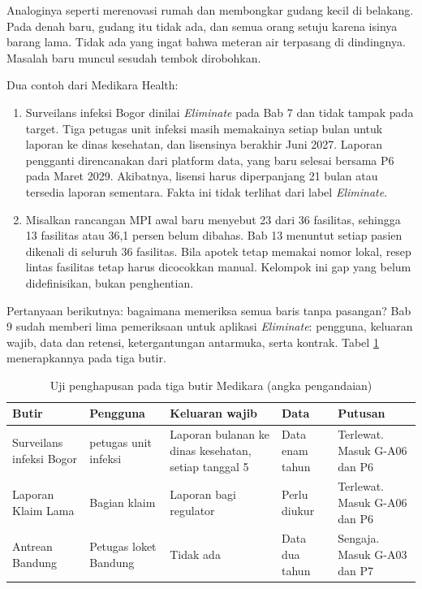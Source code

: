 Analoginya seperti merenovasi rumah dan membongkar gudang kecil di belakang. Pada
denah baru, gudang itu tidak ada, dan semua orang setuju karena isinya barang lama.
Tidak ada yang ingat bahwa meteran air terpasang di dindingnya. Masalah baru muncul
sesudah tembok dirobohkan.

Dua contoh dari Medikara Health:
\begin{enumerate}
  \item Surveilans infeksi Bogor dinilai \textit{Eliminate} pada Bab 7 dan tidak
        tampak pada target. Tiga petugas unit infeksi masih memakainya setiap bulan
        untuk laporan ke dinas kesehatan, dan lisensinya berakhir Juni 2027. Laporan
        pengganti direncanakan dari platform data, yang baru selesai bersama P6 pada
        Maret 2029. Akibatnya, lisensi harus diperpanjang 21 bulan atau tersedia
        laporan sementara. Fakta ini tidak terlihat dari label \textit{Eliminate}.
  \item Misalkan rancangan MPI awal baru menyebut 23 dari 36 fasilitas, sehingga 13
        fasilitas atau 36,1 persen belum dibahas. Bab 13 menuntut setiap pasien
        dikenali di seluruh 36 fasilitas. Bila apotek tetap memakai nomor lokal, resep
        lintas fasilitas tetap harus dicocokkan manual. Kelompok ini gap yang belum
        didefinisikan, bukan penghentian.
\end{enumerate}

Pertanyaan berikutnya: bagaimana memeriksa semua baris tanpa pasangan? Bab 9 sudah
memberi lima pemeriksaan untuk aplikasi \textit{Eliminate}: pengguna, keluaran wajib,
data dan retensi, ketergantungan antarmuka, serta kontrak. Tabel
\ref{tab:ch11-uji-penghapusan} menerapkannya pada tiga butir.

\begin{table}[!htb]
  \centering
  \caption{Uji penghapusan pada tiga butir Medikara (angka pengandaian)}
  \label{tab:ch11-uji-penghapusan}
  \footnotesize
  \begin{tabularx}{\textwidth}{>{\raggedright\arraybackslash}p{2.2cm}>{\raggedright\arraybackslash}p{2.3cm}>{\raggedright\arraybackslash}X>{\raggedright\arraybackslash}p{2.1cm}>{\raggedright\arraybackslash}X}
    \hline
    \textbf{Butir} & \textbf{Pengguna} & \textbf{Keluaran wajib} & \textbf{Data} & \textbf{Putusan} \\ \hline
    Surveilans infeksi Bogor & 3 petugas unit infeksi & Laporan bulanan ke dinas
      kesehatan, setiap tanggal 5 & Data enam tahun & Terlewat. Masuk G-A06 dan P6 \\ \hline
    Laporan Klaim Lama & Bagian klaim & Laporan bagi regulator & Perlu diukur &
      Terlewat. Masuk G-A06 dan P6 \\ \hline
    Antrean Bandung & Petugas loket Bandung & Tidak ada & Data dua tahun &
      Sengaja. Masuk G-A03 dan P7 \\ \hline
  \end{tabularx}
\end{table}

